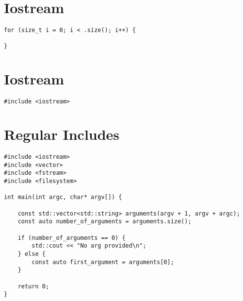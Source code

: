 
\section{Iostream}

\begin{verbatim}
for (size_t i = 0; i < .size(); i++) {
    
}
\end{verbatim}

\section{Iostream}

\begin{verbatim}
#include <iostream>
\end{verbatim}

\section{Regular Includes}

\begin{verbatim}
#include <iostream>
#include <vector>
#include <fstream>
#include <filesystem>

int main(int argc, char* argv[]) {

    const std::vector<std::string> arguments(argv + 1, argv + argc);
    const auto number_of_arguments = arguments.size();
    
    if (number_of_arguments == 0) {
        std::cout << "No arg provided\n"; 
    } else {
        const auto first_argument = arguments[0];
    }

    return 0;
}
\end{verbatim}
